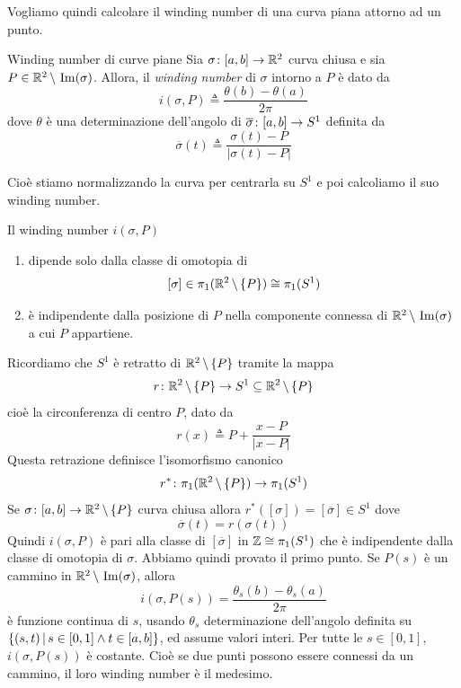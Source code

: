 \documentclass[a4paper]{article}
\begin{document}
Vogliamo quindi calcolare il winding number di una curva piana attorno ad un punto.

\begin{snippetdefinition}{Winding number di curve piane}
    Sia \(\sigma \colon [a,b] \to \mathbb{R}^2\) curva chiusa e sia
    \(P \in \mathbb{R}^2 \,\backslash\, \operatorname{Im}(\sigma)\).
    Allora, il \emph{winding number}
    di \(\sigma\) intorno a \(P\)
    è dato da
    \[
        i(\sigma, P) \triangleq \frac{\theta(b) - \theta(a)}{2\pi}
    \]
    dove \(\theta\) è una determinazione dell'angolo di \(\overline \sigma \colon [a,b] \to S^1\)
    definita da \[
        \overline\sigma(t) \triangleq \frac{\sigma(t) - P}{|\sigma(t) - P|}
    \]
\end{snippetdefinition}

Cioè stiamo normalizzando la curva per centrarla su \(S^1\) e poi calcoliamo il suo winding number.

\begin{snippetproposition}{}
    Il winding number \(i(\sigma, P)\)
    \begin{enumerate}
        \item dipende solo dalla classe di omotopia di \[
            [\sigma] \in \pi_1(\mathbb{R}^2 \,\backslash\, \{P\}) \cong \pi_1(S^1)
        \]
        \item è indipendente dalla posizione di \(P\) nella componente connessa di
        \(\mathbb{R}^2 \,\backslash\, \operatorname{Im}(\sigma)\) a cui \(P\) appartiene.
    \end{enumerate}
\end{snippetproposition}

\begin{snippetproof}{}
    Ricordiamo che \(S^1\) è retratto di \(\mathbb{R}^2 \,\backslash\, \{P\}\)
    tramite la mappa \[
        r \colon \mathbb{R}^2 \,\backslash\, \{P\} \to
        S^1 \subseteq \mathbb{R}^2 \,\backslash\, \{P\}
    \]
    cioè la circonferenza di centro \(P\), dato da
    \[
        r(x) \triangleq P + \frac{x - P}{|x-P|}
    \]
    Questa retrazione definisce l'isomorfismo canonico
    \[
        r^\ast \colon \pi_1(\mathbb{R}^2 \,\backslash\, \{P\})
        \to \pi_1(S^1)
    \]
    Se \(\sigma \colon [a,b] \to \mathbb{R}^2 \,\backslash\, \{P\}\)
    curva chiusa allora \(r^\ast([\sigma]) = [\overline\sigma] \in S^1\)
    dove \[
        \overline\sigma(t) = r(\sigma(t))
    \]
    Quindi \(i(\sigma, P)\) è pari alla classe di \([\overline\sigma]\)
    in \(\mathbb{Z} \cong \pi_1(S^1)\)
    che è indipendente dalla classe di omotopia di \(\sigma\).
    Abbiamo quindi provato il primo punto.
    Se \(P(s)\) è un cammino in \(\mathbb{R}^2 \,\backslash\, \operatorname{Im}(\sigma)\),
    allora \[
        i(\sigma, P(s)) = \frac{
            \theta_s(b) - \theta_s(a)
        }{
            2\pi
        }
    \]
    è funzione continua di \(s\),
    usando \(\theta_s\) determinazione dell'angolo definita su \(\{(s,t) \,|\, s \in [0,1] \land t \in [a,b]\}\),
    ed assume valori interi. Per tutte le \(s \in [0,1]\),
    \(i(\sigma, P(s))\) è costante.
    Cioè se due punti possono essere connessi da un cammino, il loro winding number è il medesimo.
\end{snippetproof}
\end{document}

